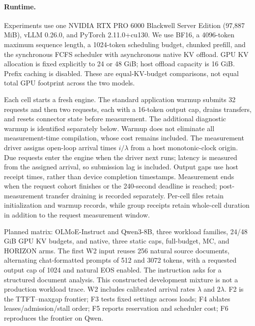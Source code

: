\documentclass[11pt]{article}
\begin{document}
\paragraph{Runtime.}
Experiments use one NVIDIA RTX PRO 6000 Blackwell Server Edition
(97,887 MiB), vLLM 0.26.0, and PyTorch 2.11.0+cu130. We use BF16,
a 4096-token maximum sequence length, a 1024-token scheduling budget,
chunked prefill, and the synchronous FCFS scheduler with asynchronous
native KV offload. GPU KV allocation is fixed explicitly to 24 or
48 GiB; host offload capacity is 16 GiB. Prefix caching is disabled.
These are equal-KV-budget comparisons, not equal total GPU footprint
across the two models.

Each cell starts a fresh engine. The standard application warmup submits
32 requests and then two requests, each with a 16-token output cap,
drains transfers, and resets connector state before measurement.
The additional diagnostic warmup is identified separately below.
Warmup does not eliminate all measurement-time compilation, whose cost
remains included. The measurement driver assigns open-loop arrival times
$i/\lambda$ from a host monotonic-clock origin. Due requests enter the
engine when the driver next runs; latency is measured from the assigned
arrival, so submission lag is included. Output gaps use host receipt
times, rather than device completion timestamps. Measurement ends when
the request cohort finishes or the 240-second deadline is reached;
post-measurement transfer draining is recorded separately. Per-cell files
retain initialization and warmup records, while group receipts retain
whole-cell duration in addition to the request measurement window.

Planned matrix: OLMoE-Instruct and Qwen3-8B, three workload families,
24/48 GiB GPU KV budgets, and native, three static caps, full-budget, MC,
and HORIZON arms. The first W2 input reuses 256 natural source documents,
alternating chat-formatted prompts of 512 and 3072 tokens, with a requested
output cap of 1024 and natural EOS enabled. The instruction asks for a
structured document analysis. This constructed development mixture is not
a production workload trace. W2 includes calibrated arrival rates $\lambda$ and
$2\lambda$. F2 is the TTFT--maxgap frontier; F3 tests fixed settings across
loads; F4 ablates leases/admission/stall order; F5 reports reservation and
scheduler cost; F6 reproduces the frontier on Qwen.
\end{document}

